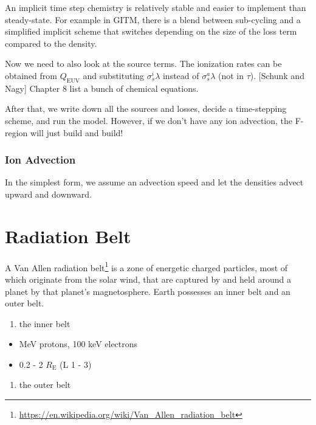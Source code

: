 \documentclass[
  notoc %
]{tufte-book}
\DeclareRobustCommand{\href}[2]{#2\footnote{\url{#1}}}
\providecommand{\tightlist}{%
  \setlength{\itemsep}{0pt}\setlength{\parskip}{0pt}
}
\begin{document}
An implicit time step chemistry is relatively stable and easier to
implement than steady-state. For example in GITM, there is a blend
between sub-cycling and a simplified implicit scheme that switches
depending on the size of the loss term compared to the density.

Now we need to also look at the source terms. The ionization rates can
be obtained from \(Q_\text{EUV}\) and substituting
\(\sigma_s^i \lambda\) instead of \(\sigma_s^a\lambda\) (not in
\(\tau\)). {[}Schunk and Nagy{]} Chapter 8 list a bunch of chemical
equations.

After that, we write down all the sources and losses, decide a
time-stepping scheme, and run the model. However, if we don't have any
ion advection, the F-region will just build and build!

\hypertarget{ion-advection}{%
\subsection{Ion Advection}\label{ion-advection}}

In the simplest form, we assume an advection speed and let the densities
advect upward and downward.

\hypertarget{sec:radiation_belt}{%
\chapter{Radiation Belt}\label{sec:radiation_belt}}

A \href{https://en.wikipedia.org/wiki/Van_Allen_radiation_belt}{Van
Allen radiation belt} is a zone of energetic charged particles, most of
which originate from the solar wind, that are captured by and held
around a planet by that planet's magnetosphere. Earth possesses an inner
belt and an outer belt.

\begin{enumerate}
\def\labelenumi{\arabic{enumi}.}
\tightlist
\item
  the inner belt
\end{enumerate}

\begin{itemize}
\tightlist
\item
  MeV protons, 100 keV electrons
\item
  0.2 - 2 \(R_\text{E}\) (L 1 - 3)
\end{itemize}

\begin{enumerate}
\def\labelenumi{\arabic{enumi}.}
\setcounter{enumi}{1}
\tightlist
\item
  the outer belt
\end{enumerate}
\end{document}
